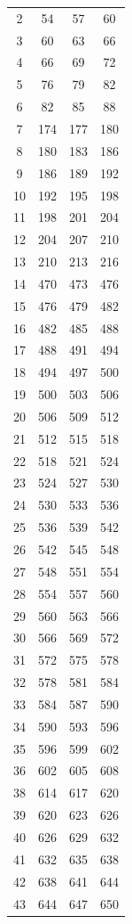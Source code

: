 \begin{center}
\begin{longtable}{cccc}
2 & 54 & 57 & 60 \\ 
3 & 60 & 63 & 66 \\ 
4 & 66 & 69 & 72 \\ 
5 & 76 & 79 & 82 \\ 
6 & 82 & 85 & 88 \\ 
7 & 174 & 177 & 180 \\ 
8 & 180 & 183 & 186 \\ 
9 & 186 & 189 & 192 \\ 
10 & 192 & 195 & 198 \\ 
11 & 198 & 201 & 204 \\ 
12 & 204 & 207 & 210 \\ 
13 & 210 & 213 & 216 \\ 
14 & 470 & 473 & 476 \\ 
15 & 476 & 479 & 482 \\ 
16 & 482 & 485 & 488 \\ 
17 & 488 & 491 & 494 \\ 
18 & 494 & 497 & 500 \\ 
19 & 500 & 503 & 506 \\ 
20 & 506 & 509 & 512 \\ 
21 & 512 & 515 & 518 \\ 
22 & 518 & 521 & 524 \\ 
23 & 524 & 527 & 530 \\ 
24 & 530 & 533 & 536 \\ 
25 & 536 & 539 & 542 \\ 
26 & 542 & 545 & 548 \\ 
27 & 548 & 551 & 554 \\ 
28 & 554 & 557 & 560 \\ 
29 & 560 & 563 & 566 \\ 
30 & 566 & 569 & 572 \\ 
31 & 572 & 575 & 578 \\ 
32 & 578 & 581 & 584 \\ 
33 & 584 & 587 & 590 \\ 
34 & 590 & 593 & 596 \\ 
35 & 596 & 599 & 602 \\ 
36 & 602 & 605 & 608 \\ 
38 & 614 & 617 & 620 \\ 
39 & 620 & 623 & 626 \\ 
40 & 626 & 629 & 632 \\ 
41 & 632 & 635 & 638 \\ 
42 & 638 & 641 & 644 \\ 
43 & 644 & 647 & 650 \\ 

\end{longtable}
\end{center}
